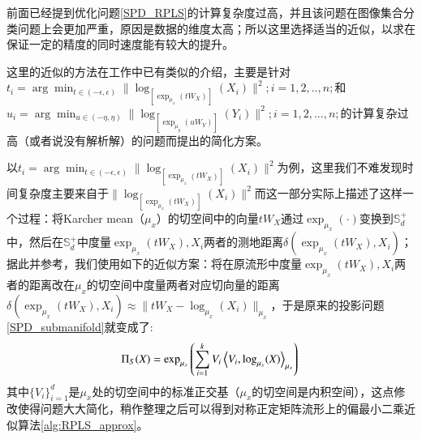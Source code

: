 前面已经提到优化问题\ref{SPD_RPLS}的计算复杂度过高，并且该问题在图像集合分类问题上会更加严重，原因是数据的维度太高；所以这里选择适当的近似，以求在保证一定的精度的同时速度能有较大的提升。

这里的近似的方法在工作\cite{RCCA,PGA}中已有类似的介绍，主要是针对$t_i=\arg\min_{t \in (-\epsilon,\epsilon)}\|\log_{[\exp_{\mu_x}(tW_X)]}(X_i)\|^2;i=1,2,..,n;$和$u_i=\arg\min_{u \in (-\eta,\eta)}\|\log_{[\exp_{\mu_y}(uW_Y)]}(Y_i)\|^2;i=1,2,...,n;$的计算复杂过高（或者说没有解析解）的问题而提出的简化方案。

以$t_i=\arg\min_{t \in (-\epsilon,\epsilon)}\|\log_{[\exp_{\mu_x}(tW_X)]}(X_i)\|^2$为例，这里我们不难发现时间复杂度主要来自于$\|\log_{[\exp_{\mu_x}(tW_X)]}(X_i)\|^2$而这一部分实际上描述了这样一个过程：将Karcher mean（$\mu_x$）的切空间中的向量$tW_X$通过$\exp_{\mu_x}(\cdot)$变换到$\mathbb{S}_{d}^{+}$中，然后在$\mathbb{S}_{d}^{+}$中度量$\exp_{\mu_x}(tW_X),X_i$两者的测地距离$\delta(\exp_{\mu_x}(tW_X),X_i)$；据此并参考\cite{PGA}，我们使用如下的近似方案：将在原流形中度量$\exp_{\mu_x}(tW_X),X_i$两者的距离改在$\mu_x$的切空间中度量两者对应切向量的距离$\delta(\exp_{\mu_x}(tW_X),X_i)\approx \|tW_X-\log_{\mu_x}(X_i)\|_{\mu_x}$，于是原来的投影问题\ref{SPD_submanifold}就变成了:
\begin{equation}
\label{tangent_approxiamte}
\Pi_{S}(X)=\exp_{\mu_x}\left(\sum_{i=1}^{k}V_i\left<V_i,\log_{\mu_x}(X)\right>_{\mu_{x}}\right)\\
\end{equation}
其中$\{V_i\}_{i=1}^{d}$是$\mu_x$处的切空间中的标准正交基（$\mu_x$的切空间是内积空间），这点修改使得问题大大简化，稍作整理之后可以得到对称正定矩阵流形上的偏最小二乘近似算法\ref{alg:RPLS_approx}。
